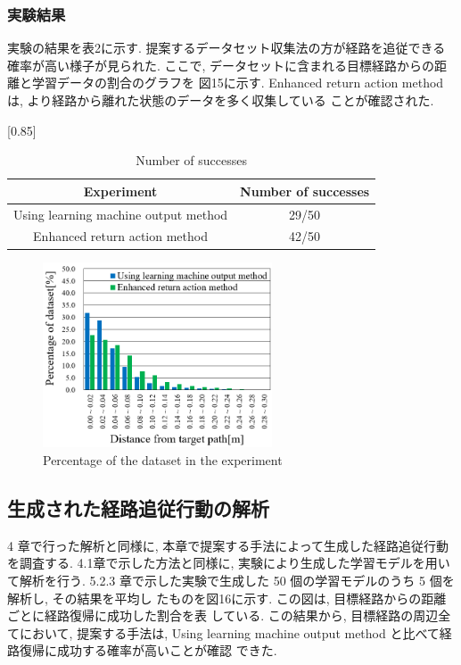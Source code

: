 \documentclass{jarticle}
\begin{document}
\subsubsection{実験結果}
実験の結果を表2に示す. 提案するデータセット収集法の方が経路を追従できる確率が高い様子が見られた.
ここで, データセットに含まれる目標経路からの距離と学習データの割合のグラフを
図15に示す. Enhanced return action method は, より経路から離れた状態のデータを多く収集している
ことが確認された.


\begin{table}[h!]
  \centering
  \caption{Number of successes} \vspace*{2mm}
    \scalebox{0.85}[0.85] {
    \begin{tabular}{|c|c|}
      \hline\hline
      Experiment & Number of successes \\
      \hline\hline
      Using learning machine output method & 29/50 \\
      Enhanced return action method & 42/50\\
      \hline 
    \end{tabular} }
\end {table}


\begin{figure}[h!]\vspace*{-5mm}
  \centering
   \includegraphics[height=55mm]{./figs/tes2.png}
   \caption{Percentage of the dataset in the experiment}
\end{figure}

\subsection{生成された経路追従行動の解析}
4 章で行った解析と同様に, 本章で提案する手法によって生成した経路追従行動を調査する.
4.1章で示した方法と同様に, 実験により生成した学習モデルを用いて解析を行う.
5.2.3 章で示した実験で生成した 50 個の学習モデルのうち 5 個を解析し, その結果を平均し
たものを図16に示す. この図は, 目標経路からの距離ごとに経路復帰に成功した割合を表
している. この結果から, 目標経路の周辺全てにおいて, 提案する手法は,
Using learning machine output method と比べて経路復帰に成功する確率が高いことが確認
できた.
\end{document}
